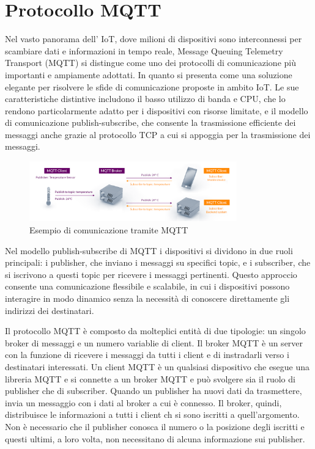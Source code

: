 \documentclass[12pt,a4paper,openright,twoside]{book}
\begin{document}
\section{Protocollo MQTT}

Nel vasto panorama dell' \ac{IoT}, dove milioni di dispositivi sono interconnessi per scambiare dati e informazioni in tempo reale, Message Queuing Telemetry Transport (MQTT) 
si distingue come uno dei protocolli di comunicazione più importanti e ampiamente adottati. In quanto si presenta come una soluzione elegante per risolvere le sfide di 
comunicazione proposte in ambito \ac*{IoT}. Le sue caratteristiche distintive includono il basso utilizzo di banda e CPU, che lo rendono particolarmente adatto per i 
dispositivi con risorse limitate, e il modello di comunicazione publish-subscribe, che consente la trasmissione efficiente dei messaggi anche grazie al protocollo 
\ac{TCP} a cui si appoggia per la trasmissione dei messaggi.

\begin{figure}[H]
    \centering
    \includegraphics[width=0.8\textwidth]{figures/mqtt-example.png}
    \caption{Esempio di comunicazione tramite MQTT}
    \label{fig:mqtt-example}
\end{figure}

Nel modello publish-subscribe di \ac{MQTT} i dispositivi si dividono in due ruoli principali:
 i publisher, che inviano i messaggi su specifici topic, e i subscriber, che si iscrivono a questi topic per ricevere i messaggi pertinenti. 
 Questo approccio consente una comunicazione flessibile e scalabile, in cui i dispositivi possono interagire in modo dinamico senza la necessità
 di conoscere direttamente gli indirizzi dei destinatari.

Il protocollo \ac{MQTT} è composto da molteplici entità di due tipologie: un singolo broker di messaggi e un numero variablie di client. Il broker \ac{MQTT} è un server 
con la funzione di ricevere i messaggi da tutti i client e di instradarli verso i destinatari interessati. Un client MQTT è un qualsiasi dispositivo che esegue una libreria 
\ac{MQTT} e si connette a un broker \ac{MQTT} e può svolgere sia il ruolo di publisher che di subscriber. Quando un publisher ha nuovi dati da trasmettere, 
invia un messaggio con i dati al broker a cui è connesso. Il broker, quindi, distribuisce le informazioni a tutti i client ch si sono iscritti a quell’argomento. 
Non è necessario che il publisher conosca il numero o la posizione degli iscritti e questi ultimi, a loro volta, non necessitano di alcuna informazione sui publisher.
\end{document}
